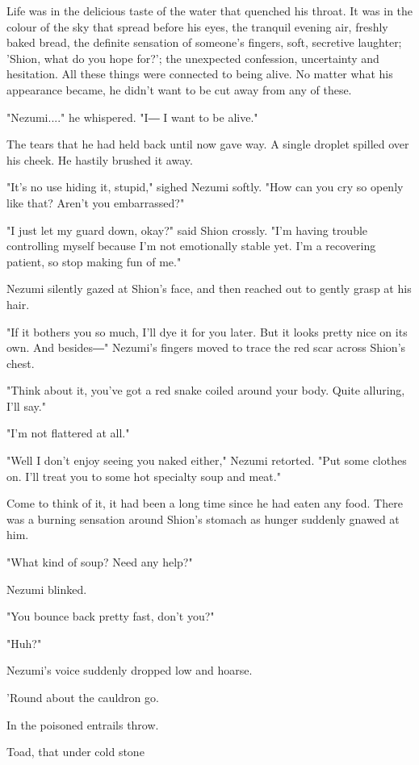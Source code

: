 Life was in the delicious taste of the water that quenched his throat.
It was in the colour of the sky that spread before his eyes, the
tranquil evening air, freshly baked bread, the definite sensation of
someone's fingers, soft, secretive laughter; 'Shion, what do you hope
for?'; the unexpected confession, uncertainty and hesitation. All these
things were connected to being alive. No matter what his appearance
became, he didn't want to be cut away from any of these.

"Nezumi...." he whispered. "I― I want to be alive."

The tears that he had held back until now gave way. A single droplet
spilled over his cheek. He hastily brushed it away.

"It's no use hiding it, stupid," sighed Nezumi softly. "How can you cry
so openly like that? Aren't you embarrassed?"

"I just let my guard down, okay?" said Shion crossly. "I'm having
trouble controlling myself because I'm not emotionally stable yet. I'm a
recovering patient, so stop making fun of me."

Nezumi silently gazed at Shion's face, and then reached out to gently
grasp at his hair.

"If it bothers you so much, I'll dye it for you later. But it looks
pretty nice on its own. And besides―" Nezumi's fingers moved to trace
the red scar across Shion's chest.

"Think about it, you've got a red snake coiled around your body. Quite
alluring, I'll say."

"I'm not flattered at all."

"Well I don't enjoy seeing you naked either," Nezumi retorted. "Put some
clothes on. I'll treat you to some hot specialty soup and meat."

Come to think of it, it had been a long time since he had eaten any
food. There was a burning sensation around Shion's stomach as hunger
suddenly gnawed at him.

"What kind of soup? Need any help?"

Nezumi blinked.

"You bounce back pretty fast, don't you?"

"Huh?"

Nezumi's voice suddenly dropped low and hoarse.

'Round about the cauldron go.

In the poisoned entrails throw.

Toad, that under cold stone

